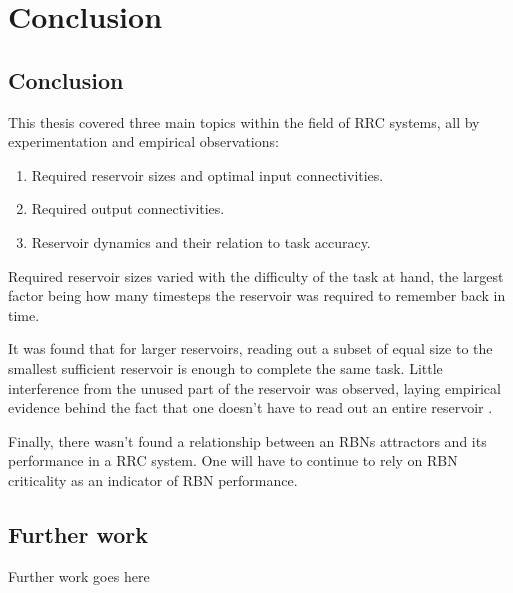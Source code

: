 \chapter{Conclusion}
\label{chapter:conclusion}

\section{Conclusion}

This thesis covered three main topics within the field of RRC systems,
all by experimentation and empirical observations:

\begin{enumerate}
    \item Required reservoir sizes and optimal input connectivities.
    \item Required output connectivities.
    \item Reservoir dynamics and their relation to task accuracy.
\end{enumerate}

Required reservoir sizes varied with the difficulty of the task at hand,
the largest factor being how many timesteps the reservoir was required to remember back in time.

It was found that for larger reservoirs, reading out a subset of equal size to the smallest sufficient reservoir is enough to complete the same task.
Little interference from the unused part of the reservoir was observed,
laying empirical evidence behind the fact that one doesn't have to read out an entire reservoir .

Finally, there wasn't found a relationship between an RBNs attractors and its performance in a RRC system.
One will have to continue to rely on RBN criticality as an indicator of RBN performance.


\section{Further work}

Further work goes here 
